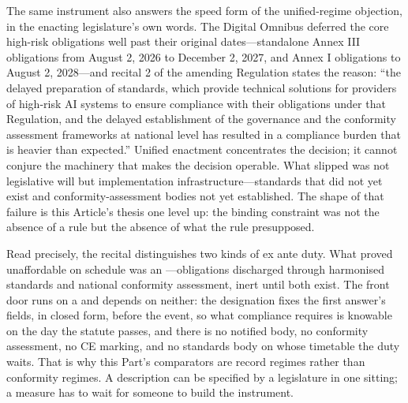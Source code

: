 The same instrument also answers the speed form of the unified-regime objection, in the enacting legislature's own words. The Digital Omnibus deferred the core high-risk obligations well past their original dates---standalone Annex III obligations from August 2, 2026 to December 2, 2027, and Annex I obligations to August 2, 2028---and recital 2 of the amending Regulation states the reason: ``the delayed preparation of standards, which provide technical solutions for providers of high-risk AI systems to ensure compliance with their obligations under that Regulation, and the delayed establishment of the governance and the conformity assessment frameworks at national level has resulted in a compliance burden that is heavier than expected.'' Unified enactment concentrates the decision; it cannot conjure the machinery that makes the decision operable. What slipped was not legislative will but implementation infrastructure---standards that did not yet exist and conformity-assessment bodies not yet established. The shape of that failure is this Article's thesis one level up: the binding constraint was not the absence of a rule but the absence of what the rule presupposed.

Read precisely, the recital distinguishes two kinds of ex ante duty. What proved unaffordable on schedule was an ---obligations discharged through harmonised standards and national conformity assessment, inert until both exist. The front door runs on a  and depends on neither: the designation fixes the first answer's fields, in closed form, before the event, so what compliance requires is knowable on the day the statute passes, and there is no notified body, no conformity assessment, no CE marking, and no standards body on whose timetable the duty waits. That is why this Part's comparators are record regimes rather than conformity regimes. A description can be specified by a legislature in one sitting; a measure has to wait for someone to build the instrument.

